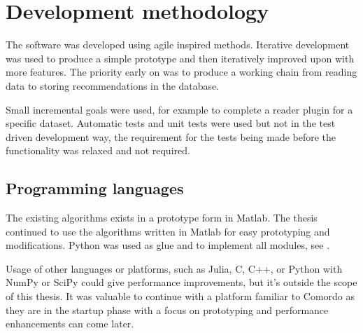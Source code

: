 \section{Development methodology}

The software was developed using agile inspired methods. Iterative development was used to produce a simple prototype and then iteratively improved upon with more features.  The priority early on was to produce a working chain from reading data to storing recommendations in the database.

Small incremental goals were used, for example to complete a reader plugin for a specific dataset.  Automatic tests and unit tests were used but not in the test driven development way, the requirement for the tests being made before the functionality was relaxed and not required.


\subsection{Programming languages}

The existing algorithms exists in a prototype form in Matlab. The thesis continued to use the algorithms written in Matlab for easy prototyping and modifications. Python was used as glue and to implement all modules, see .

Usage of other languages or platforms, such as Julia, C, C++, or Python with NumPy or SciPy could give performance improvements, but it's outside the scope of this thesis.  It was valuable to continue with a platform familiar to Comordo as they are in the startup phase with a focus on prototyping and performance enhancements can come later.

